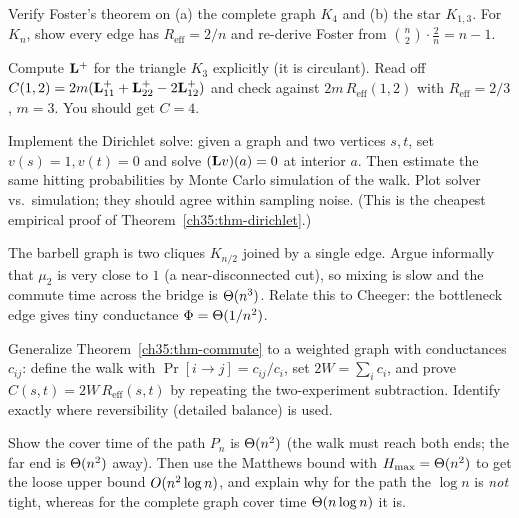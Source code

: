 \begin{exercise}
Verify Foster's theorem on (a) the complete graph $K_4$ and (b) the star $K_{1,3}$. For $K_n$, show every edge has $R_{\mathrm{eff}}=2/n$ and re-derive Foster from $\binom n2\cdot\frac2n=n-1$.
\end{exercise}

\begin{exercise}
Compute $\mathbf{L}^+$ for the triangle $K_3$ explicitly (it is circulant). Read off $C(1,2)=2m(\mathbf{L}^+_{11}+\mathbf{L}^+_{22}-2\mathbf{L}^+_{12})$ and check against $2m\,R_{\mathrm{eff}}(1,2)$ with $R_{\mathrm{eff}}=2/3$, $m=3$. You should get $C=4$.
\end{exercise}

\begin{exercise}[Harmonic = hitting probability, coded]
Implement the Dirichlet solve: given a graph and two vertices $s,t$, set $v(s)=1,v(t)=0$ and solve $(\mathbf{L} v)(a)=0$ at interior $a$. Then estimate the same hitting probabilities by Monte Carlo simulation of the walk. Plot solver vs.\ simulation; they should agree within sampling noise. (This is the cheapest empirical proof of Theorem~\ref{ch35:thm-dirichlet}.)
\end{exercise}

\begin{exercise}
The barbell graph is two cliques $K_{n/2}$ joined by a single edge. Argue informally that $\mu_2$ is very close to $1$ (a near-disconnected cut), so mixing is slow and the commute time across the bridge is $\Theta(n^3)$. Relate this to Cheeger: the bottleneck edge gives tiny conductance $\Phi=\Theta(1/n^2)$.
\end{exercise}

\begin{exercise}
Generalize Theorem~\ref{ch35:thm-commute} to a weighted graph with conductances $c_{ij}$: define the walk with $\Pr[i\to j]=c_{ij}/c_i$, set $2W=\sum_i c_i$, and prove $C(s,t)=2W\,R_{\mathrm{eff}}(s,t)$ by repeating the two-experiment subtraction. Identify exactly where reversibility (detailed balance) is used.
\end{exercise}

\begin{exercise}
Show the cover time of the path $P_n$ is $\Theta(n^2)$ (the walk must reach both ends; the far end is $\Theta(n^2)$ away). Then use the Matthews bound with $H_{\max}=\Theta(n^2)$ to get the loose upper bound $O(n^2\log n)$, and explain why for the path the $\log n$ is \emph{not} tight, whereas for the complete graph cover time $\Theta(n\log n)$ it is.
\end{exercise}
